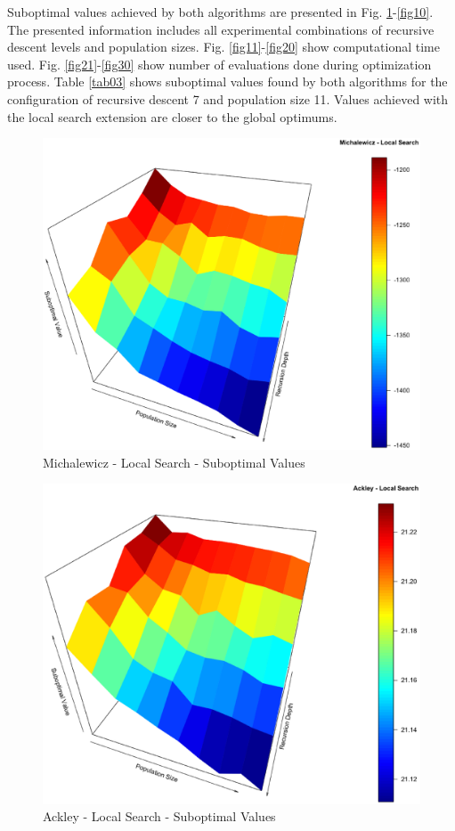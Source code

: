 \documentclass[conference]{IEEEtran}
\begin{document}
Suboptimal values achieved by both algorithms are presented in Fig. \ref{fig01}-\ref{fig10}. The presented information includes all experimental combinations of recursive descent levels and population sizes. Fig. \ref{fig11}-\ref{fig20} show computational time used. Fig. \ref{fig21}-\ref{fig30} show number of evaluations done during optimization process. Table \ref{tab03} shows suboptimal values found by both algorithms for the configuration of recursive descent 7 and population size 11. Values achieved with the local search extension are closer to the global optimums.

\begin{figure}[tbp]
\centering
\includegraphics[width=1.0\hsize,height=0.65\hsize]{fig03.eps}
\caption{Michalewicz - Local Search - Suboptimal Values}
\label{fig01}
\end{figure}

\begin{figure}[tbp]
\centering
\includegraphics[width=1.0\hsize,height=0.65\hsize]{fig06.eps}
\caption{Ackley - Local Search - Suboptimal Values}
\label{fig02}
\end{figure}
\end{document}
